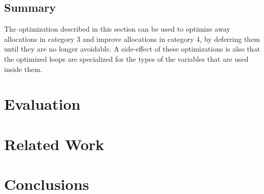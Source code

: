 \documentclass{sigplanconf}
\begin{document}

\subsection{Summary}

The optimization described in this section can be used to optimize away
allocations in category 3 and improve allocations in category 4, by deferring
them until they are no longer avoidable. A side-effect of these optimizations
is also that the optimized loops are specialized for the types of the variables
that are used inside them.


\section{Evaluation}
\label{sec:Evaluation}


\section{Related Work}
\label{sec:related}

\section{Conclusions}
\label{sec:conclusions}



\end{document}
